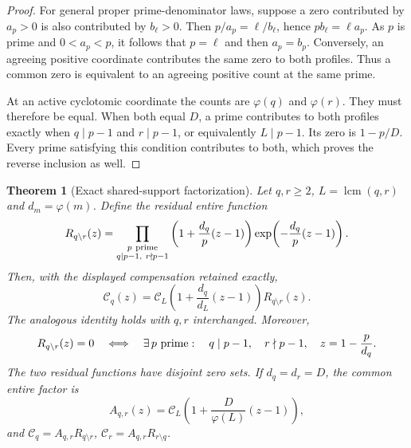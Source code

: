 \documentclass[11pt]{article}
\newtheorem{theorem}{Theorem}[section]
\theoremstyle{definition}
\begin{document}
\begin{proof}
For general proper prime-denominator laws, suppose a zero contributed
by $a_p>0$ is also contributed by $b_\ell>0$. Then
$p/a_p=\ell/b_\ell$, hence $p b_\ell=\ell a_p$.
As $p$ is prime and $0<a_p<p$, it follows that $p=\ell$ and
then $a_p=b_p$.
Conversely, an agreeing positive coordinate contributes the same zero
to both profiles. Thus a common zero is equivalent to an agreeing
positive count at the same prime.

At an active cyclotomic coordinate the counts are $\varphi(q)$ and
$\varphi(r)$. They must therefore be equal. When both equal $D$, a
prime contributes to both profiles exactly when
$q\mid p-1$ and $r\mid p-1$, or equivalently $L\mid p-1$.
Its zero is $1-p/D$. Every prime satisfying this condition contributes
to both, which proves the reverse inclusion as well.
\end{proof}

\begin{theorem}[Exact shared-support factorization]\label{thm:cyclotomic-shared-factor}
Let $q,r\ge2$, $L=\operatorname{lcm}(q,r)$ and $d_m=\varphi(m)$.
Define the residual entire function
\[
 R_{q\setminus r}(z)=
 \prod_{\substack{p\ {\rm prime}\\q\mid p-1,\ r\nmid p-1}}
 \left(1+\frac{d_q}{p}(z-1)\right)
       \exp\!\left(-\frac{d_q}{p}(z-1)\right).
\]
Then, with the displayed compensation retained exactly,
\[
 \mathcal C_q(z)=
 \mathcal C_L\!\left(1+\frac{d_q}{d_L}(z-1)\right)
 R_{q\setminus r}(z).
\]
The analogous identity holds with $q,r$ interchanged. Moreover,
\[
 R_{q\setminus r}(z)=0
 \quad\Longleftrightarrow\quad
 \exists\,p\ {\rm prime}:\quad
 q\mid p-1,\quad r\nmid p-1,\quad z=1-\frac{p}{d_q}.
\]
The two residual functions have disjoint zero sets.
If $d_q=d_r=D$, the common entire factor is
\[
 A_{q,r}(z)=
 \mathcal C_L\!\left(1+\frac{D}{\varphi(L)}(z-1)\right),
\]
and $\mathcal C_q=A_{q,r}R_{q\setminus r}$,
$\mathcal C_r=A_{q,r}R_{r\setminus q}$.
\end{theorem}
\end{document}

